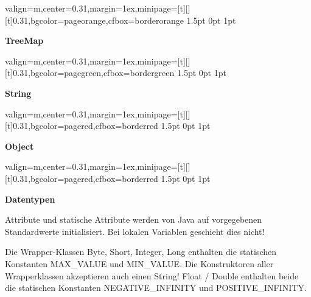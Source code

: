 \documentclass[11pt, a4paper, landscape]{article}
\newcommand{\fancyheader}[1]{
	\centerline{\sffamily \textbf{ \large #1}}
}
\newenvironment{fancybox}[2]
{
	\begin{adjustbox}{valign=m,center=0.31\textwidth,margin=1ex,minipage=[t][][t]{0.31\textwidth},bgcolor=#1,cfbox=#2 1.5pt 0pt 1pt}
	\begin{centering}
}
{
	\end{centering}
	\end{adjustbox}
}
\begin{document}
\begin{multicols}{3}
\begin{fancybox}{pageorange}{borderorange}
\fancyheader{TreeMap}

\end{fancybox}

\begin{fancybox}{pagegreen}{bordergreen}
\fancyheader{String}

\end{fancybox}

\begin{fancybox}{pagered}{borderred}
\fancyheader{Object}

\end{fancybox}

\begin{fancybox}{pagered}{borderred}
\fancyheader{Datentypen}
\raggedright {
Attribute und statische Attribute werden von Java auf vorgegebenen Standardwerte initialisiert. Bei lokalen Variablen geschieht dies nicht!
}

\vspace{3mm}


\vspace{3mm}
\raggedright {
	Die Wrapper-Klassen {\ttfamily Byte}, {\ttfamily Short}, {\ttfamily Integer}, {\ttfamily Long} enthalten die statischen Konstanten {\ttfamily MAX_VALUE} und {\ttfamily MIN_VALUE}. Die Konstruktoren aller Wrapperklassen akzeptieren auch einen String! \newline
	{\ttfamily Float} / {\ttfamily Double} enthalten beide die statischen Konstanten {\ttfamily NEGATIVE_INFINITY} und {\ttfamily POSITIVE_INFINITY}.
}


\end{fancybox}
\end{multicols}
\end{document}
